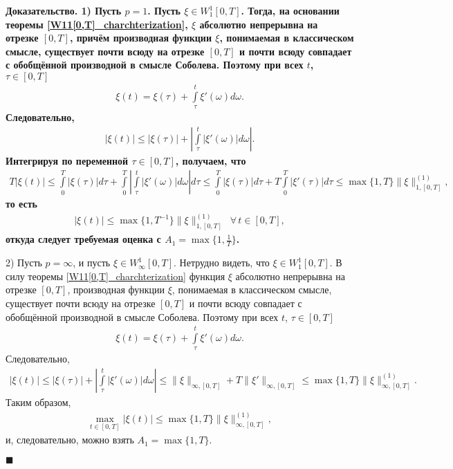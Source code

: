 \documentclass{report}
\newenvironment{Proof}{\par\noindent\bf Доказательство.\rm}{ $\blacksquare$\par}
\begin{document}
\begin{Proof}
1) Пусть $p=1$. Пусть $\xi\in W^1_1[0,T]$. Тогда, на основании теоремы \ref{W11[0,T]_charchterization}, $\xi$ абсолютно непрерывна на отрезке $[0,T]$, причём производная функции $\xi$,
понимаемая в классическом смысле, существует почти всюду на отрезке $[0,T]$ и почти всюду совпадает с обобщённой производной в смысле Соболева. Поэтому при всех $t$, $\tau\in[0,T]$
\begin{gather*}
\xi(t)=\xi(\tau)+\int\limits_\tau^t\xi'(\omega)d\omega.
\end{gather*}
Следовательно,
\begin{gather*}
|\xi(t)|\leqslant|\xi(\tau)|+\left|\int\limits_\tau^t|\xi'(\omega)|d\omega\right|.
\end{gather*}
Интегрируя по переменной $\tau\in[0,T]$, получаем, что
\begin{gather*}
T|\xi(t)|\leqslant\int\limits_0^T|\xi(\tau)|d\tau+\int\limits_0^T\left|\int\limits_\tau^t|\xi'(\omega)|d\omega\right|d\tau\leqslant
\int\limits_0^T|\xi(\tau)|d\tau+T\int\limits_0^T|\xi'(\tau)|d\tau\leqslant\max\{1,T\}\|\xi\|_{1,[0,T]}^{(1)},
\end{gather*}
то есть
\begin{gather*}
|\xi(t)|\leqslant\max\{1,T^{-1}\}\|\xi\|_{1,[0,T]}^{(1)}\,\,\,\forall\, t\in[0,T],
\end{gather*}
откуда следует требуемая оценка с $A_1=\max\{1,\frac1T\}$.

2) Пусть $p=\infty$, и пусть $\xi\in W^1_\infty[0,T]$. Нетрудно видеть, что $\xi\in W^1_1[0,T]$. В силу теоремы \ref{W11[0,T]_charchterization} функция $\xi$  абсолютно непрерывна на
отрезке $[0,T]$, производная функции $\xi$, понимаемая в классическом смысле, существует почти всюду на отрезке $[0,T]$ и почти всюду совпадает с обобщённой производной в смысле Соболева.
Поэтому при всех $t$, $\tau\in[0,T]$
\begin{gather*}
\xi(t)=\xi(\tau)+\int\limits_\tau^t\xi'(\omega)d\omega.
\end{gather*}
Следовательно,
\begin{gather*}
|\xi(t)|\leqslant|\xi(\tau)|+\left|\int\limits_\tau^t|\xi'(\omega)|d\omega\right|\leqslant\|\xi\|_{\infty,[0,T]}+T\|\xi'\|_{\infty,[0,T]}\leqslant\max\{1,T\}\|\xi\|_{\infty,[0,T]}^{(1)}.
\end{gather*}
Таким образом,
\begin{gather*}
\max\limits_{t\in[0,T]}|\xi(t)|\leqslant\max\{1,T\}\|\xi\|_{\infty,[0,T]}^{(1)},
\end{gather*}
и, следовательно, можно взять $A_1=\max\{1,T\}$.


\end{Proof}
\end{document}

